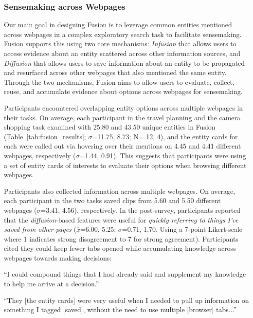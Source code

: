 \subsubsection{Sensemaking across Webpages}
Our main goal in designing Fusion is to leverage common entities mentioned across webpages in a complex exploratory search task to facilitate sensemaking.
Fusion supports this using two core mechanisms: \emph{Infusion} that allows users to access evidence about an entity scattered across other information sources, and \emph{Diffusion} that allows users to save information about an entity to be propagated and resurfaced across other webpages that also mentioned the same entity. Through the two mechanisms, Fusion aims to allow users to evaluate, collect, reuse, and accumulate evidence about options across webpages for sensemaking.

Participants encountered overlapping entity options across multiple webpages in their tasks. On average, each participant in the travel planning and the camera shopping task examined with 25.80 and 43.50 unique entities in Fusion (Table~\ref{tab:fusion_results}; $\sigma$=11.75, 8.73; N= 12, 4), and the entity cards for each were called out via hovering over their mentions on 4.45 and 4.41 different webpages, respectively ($\sigma$=1.44, 0.91). This suggests that participants were using a set of entity cards of interests to evaluate their options when browsing different webpages.

Participants also collected information across multiple webpages. On average, each participant in the two tasks saved clips from 5.60 and 5.50 different webpages ($\sigma$=3.41, 4.56), respectively. 
In the post-survey, participants reported that the \emph{diffusion}-based features were useful for \emph{quickly referring to things I've saved from other pages} ($\bar{x}$=6.00, 5.25; $\sigma$=0.71, 1.70. Using a 7-point Likert-scale where 1 indicates strong disagreement to 7 for strong agreement). Participants cited they could keep fewer tabs opened while accumulating knowledge across webpages towards making decisions: 

\begin{tightquote}
``I could compound things that I had already said and supplement my knowledge to help me arrive at a decision.''

``They [the entity cards] were very useful when I needed to pull up information on something I tagged [saved], without the need to use multiple [browser] tabs...'' 
\end{tightquote}

